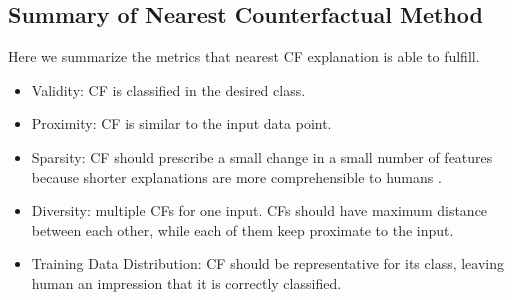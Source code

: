 \subsection{Summary of Nearest Counterfactual Method}
Here we summarize the metrics that nearest CF explanation is able to fulfill.
 \begin{itemize}
 \item Validity: CF is classified in the desired class.
 \item Proximity: CF is similar to the input data point.
   \item  Sparsity: CF should prescribe a small change in a small number of features because shorter explanations are more comprehensible to humans \cite{CFReview}. %
   \item  Diversity: multiple CFs for one input. CFs should have maximum distance between each other, while each of them keep proximate to the input.
   \item  Training Data Distribution: CF should be representative for its class, leaving human an impression that it is correctly classified.
 \end{itemize} 